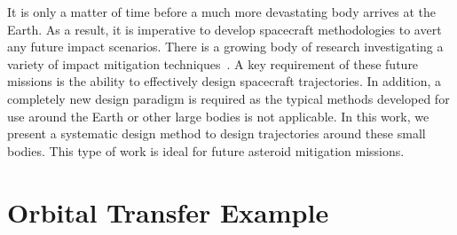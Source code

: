 \documentclass[11pt,reqno]{amsart} %
\begin{document}
\begin{multicols}{2}
It is only a matter of time before a much more devastating body arrives at the Earth.
As a result, it is imperative to develop spacecraft methodologies to avert any future impact scenarios.
There is a growing body of research investigating a variety of impact mitigation techniques~\cite{wie2008,pitz2014}.
A key requirement of these future missions is the ability to effectively design spacecraft trajectories. 
In addition, a completely new design paradigm is required as the typical methods developed for use around the Earth or other large bodies is not applicable. 
In this work, we present a systematic design method to design trajectories around these small bodies. 
This type of work is ideal for future asteroid mitigation missions.

\section{Orbital Transfer Example}
\begin{figure}[H]
\begin{scaletikzpicturetowidth}{0.1\columnwidth}
\end{scaletikzpicturetowidth}
\end{figure}
\end{multicols}
\end{document}
